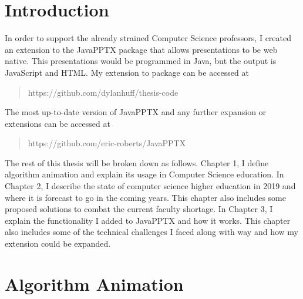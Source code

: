 \documentclass[12pt,twoside]{reedthesis}
\begin{document}

    \chapter*{Introduction}
	In order to support the already strained Computer Science professors, I created an extension to the JavaPPTX package that allows presentations to be web native. This presentations would be programmed in Java, but the output is JavaScript and HTML. My extension to package can be accessed at \begin{quote} https://github.com/dylanhuff/thesis-code \end{quote} The most up-to-date version of JavaPPTX and any further expansion or extensions can be accessed at \begin{quote} https://github.com/eric-roberts/JavaPPTX \end{quote} The rest of this thesis will be broken down as follows. Chapter 1, I define algorithm animation and explain its usage in Computer Science education. In Chapter 2, I describe the state of computer science higher education in 2019 and where it is forecast to go in the coming years. This chapter also includes some proposed solutions to combat the current faculty shortage. In Chapter 3, I explain the functionality I added to JavaPPTX and how it works. This chapter also includes some of the technical challenges I faced along with way and how my extension could be expanded. 
	
\chapter{Algorithm Animation}
	
\end{document}
